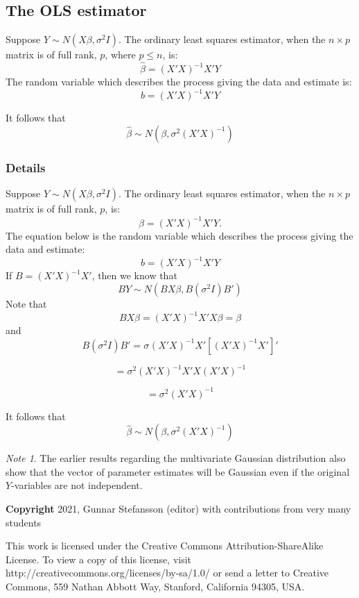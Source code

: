 \documentclass[12pt,a4paper]{article}
\theoremstyle{regla}
\theoremstyle{remark}
\newtheorem{notes}{Note}[section]
\theoremstyle{definition}
\theoremstyle{nonumberbreak}
\begin{document}
\subsection{The OLS estimator}
\begin{fbox}
\begin{minipage}{0.97\textwidth}
Suppose $Y \sim N(X \beta,\sigma^2 I)$. The ordinary least squares estimator, when the $n \times p$ matrix is of full rank, $p$, where $p\leq n$, is:
$$ \hat{\beta} = (X'X)^{-1}X'Y$$
The random variable which describes the process giving the data and estimate is:
$$
b = (X'X)^{-1}X'Y
$$

It follows that
$$\hat{\beta} \sim N(\beta,\sigma^{2}(X'X)^{-1})$$

\end{minipage}
\end{fbox}
\subsubsection{Details}
Suppose $Y \sim N(X \beta,\sigma^2I)$. The ordinary least squares estimator, when the $n \times p$ matrix is of full rank, $p$, is:
$$ \hat{\beta} = (X'X)^{-1}X'Y.$$
The equation below is the random variable which describes the process giving the data and estimate:
$$ b = (X'X)^{-1}X'Y $$
If $B = (X'X)^{-1}X'$, then we know that
$$ BY \sim N(B X \beta, B(\sigma^{2}I)B')$$
Note that 
$$ BX\beta = (X'X)^{-1}X'X\beta=\beta $$
and
$$ B(\sigma^{2}I)B' = \sigma^{}(X'X)^{-1}X'[(X'X)^{-1}X']' $$

$$ = \sigma^{2}(X'X)^{-1}X'X(X'X)^{-1}$$

$$ = \sigma^{2}(X'X)^{-1} $$

It follows that
$$ \hat{\beta} \sim N(\beta,\sigma^{2}(X'X)^{-1}) $$

\begin{notes}
The earlier results regarding the multivariate Gaussian distribution also show that the vector of parameter estimates will be Gaussian even if the original $Y$-variables are not independent.
\end{notes}

{\bf Copyright}
2021, Gunnar Stefansson (editor) with contributions from very many students

This work is licensed under the Creative Commons
Attribution-ShareAlike License. To view a copy of this license, visit
http://creativecommons.org/licenses/by-sa/1.0/ or send a letter to
Creative Commons, 559 Nathan Abbott Way, Stanford, California 94305,
USA.
\clearpage
\end{document}
